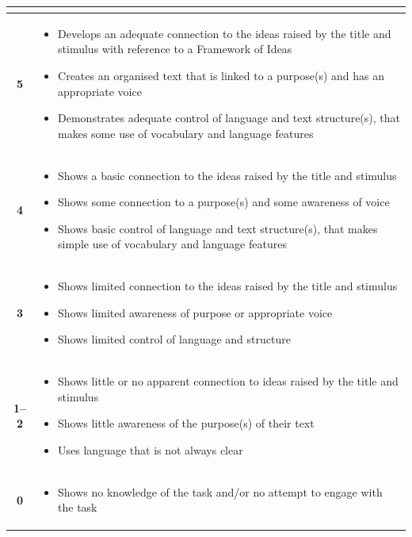 \documentclass[a4paper]{article}
\begin{document}
\begin{longtable}{|c|p{13cm}|}
\begin{itemize}
\end{itemize} \\
\hline
\textbf{5} & 
\begin{itemize}
  \item Develops an adequate connection to the ideas raised by the title and stimulus with reference to a Framework of Ideas
  \item Creates an organised text that is linked to a purpose(s) and has an appropriate voice
  \item Demonstrates adequate control of language and text structure(s), that makes some use of vocabulary and language features
\end{itemize} \\
\hline
\textbf{4} & 
\begin{itemize}
  \item Shows a basic connection to the ideas raised by the title and stimulus
  \item Shows some connection to a purpose(s) and some awareness of voice
  \item Shows basic control of language and text structure(s), that makes simple use of vocabulary and language features
\end{itemize} \\
\hline
\textbf{3} & 
\begin{itemize}
  \item Shows limited connection to the ideas raised by the title and stimulus
  \item Shows limited awareness of purpose or appropriate voice
  \item Shows limited control of language and structure
\end{itemize} \\
\hline
\textbf{1--2} & 
\begin{itemize}
  \item Shows little or no apparent connection to ideas raised by the title and stimulus
  \item Shows little awareness of the purpose(s) of their text
  \item Uses language that is not always clear
\end{itemize} \\
\hline
\textbf{0} & 
\begin{itemize}
  \item Shows no knowledge of the task and/or no attempt to engage with the task
\end{itemize} \\
\hline
\end{longtable}
\end{document}
